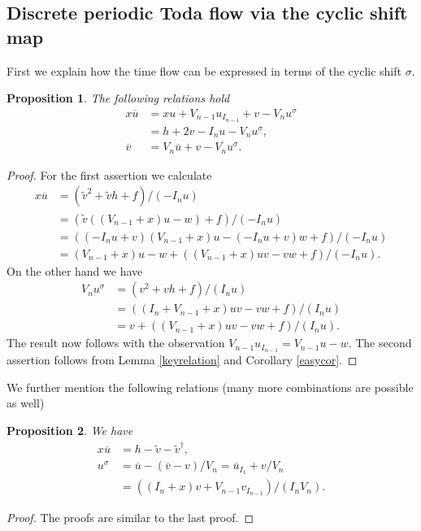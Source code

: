 \documentclass[11pt, a4paper]{amsart}
\theoremstyle{plain}
\newtheorem{proposition}{Proposition}[section]
\numberwithin{equation}{section}
\begin{document}
\subsection{Discrete periodic Toda flow via the cyclic shift map}
First we explain how the time flow can be expressed in terms of the cyclic shift $\sigma$.
\begin{proposition}
\label{cyclictime}
The following relations hold
\begin{align*}
x \overline u &= x u +V_{n-1} u_{I_{n-1}} + v - V_n u^\sigma \\
			&= h +2v - I_n u  - V_n u^\sigma, \\
\overline v &= V_n \overline u + v - V_n u^\sigma.
\end{align*}
\end{proposition}
\begin{proof}
For the first assertion we calculate 
\begin{align*} x \overline u &= (\tilde v ^2 + \tilde v h +f)/(-I_n u) \\
&= (\tilde v ((V_{n-1}+x) u - w) + f) / (-I_n u) \\
&= ((-I_n u + v) (V_{n-1}+x) u - (-I_n u +v) w + f)/(-I_n u) \\
&= (V_{n-1}+x) u - w + ((V_{n-1}+x) u v - vw + f)/(-I_n u).
\end{align*}
On the other hand we have \begin{align*}
V_n u^\sigma &= (v^2 + vh +f)/(I_nu) \\
&=  ((I_n+V_{n-1}+x)uv-vw +f) / (I_n u) \\
&= v + ((V_{n-1}+x)uv-vw+f)/(I_n u).
\end{align*}
The result now follows with the observation $V_{n-1}u_{I_{n-1}} = V_{n-1}u-w$.
The second assertion follows from Lemma \ref{keyrelation} and Corollary \ref{easycor}.
\end{proof}
\noindent We further mention the following relations (many more combinations are possible as well)
\begin{proposition}
We have
\begin{align*}
x \overline u &= h -\tilde v - \tilde v ^\dagger, \\
u^\sigma &= \overline u -(\overline v - v)/V_n = \overline u _{I_1} + v/V_n \\
&= ((I_n+x) v + V_{n-1} v_{I_{n-1}})/(I_nV_n).
\end{align*}
\end{proposition}
\begin{proof}
The proofs are similar to the last proof.
\end{proof}
\end{document}
